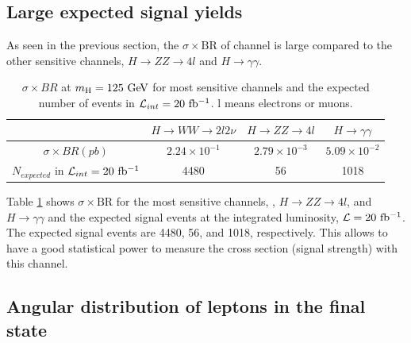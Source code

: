  

\newpage
\section{\hww} 

%
\subsection{Large expected signal yields}
As seen in the previous section, the $\sigma \times \textrm{BR}$ of \hww{} channel 
is large compared to the other sensitive channels, $H \rightarrow ZZ\rightarrow 4l$
and $H \rightarrow\gamma\gamma$. 
\begin{table}[htb]
\centering
\begin{tabular}{c c c c}
\hline 
        & $H \rightarrow WW \rightarrow 2l2\nu$   & $H \rightarrow ZZ\rightarrow 4l$ 
        & $H \rightarrow\gamma\gamma$  \\
\hline \hline 
$\sigma \times BR (pb)$  
        & $2.24\times10^{-1}$ &  $2.79\times10^{-3}$ & $5.09\times10^{-2}$ \\ 
$N_{expected}$ in $\mathcal{L}_{int} = 20~\mathrm{fb^{-1}}$ 
        & 4480 &  56 & 1018 \\ 
\hline 
\end{tabular}
\label{tab:XSBR_8TeV_SM_125}
\caption{$\sigma \times BR$ at $m_{\mathrm{H}}=125~\mathrm{Ge\kern -0.1em V}$ for most sensitive channels 
and the expected number of events in $\mathcal{L}_{int} = 20~\mathrm{fb^{-1}}$.
l means electrons or muons.}
\end{table}
Table \ref{tab:XSBR_8TeV_SM_125} shows $\sigma \times \textrm{BR}$ for 
the most sensitive channels, \hww, $H \rightarrow ZZ\rightarrow 4l$,
and $H \rightarrow\gamma\gamma$ and the expected signal events at
the integrated luminosity, $\mathcal{L}=20~\mathrm{fb^{-1}}$. The expected signal 
events are 4480, 56, and 1018, respectively. This allows to have a 
good statistical power to measure the cross section (signal strength)
with this channel. 

%
\subsection{Angular distribution of leptons in the final state}

